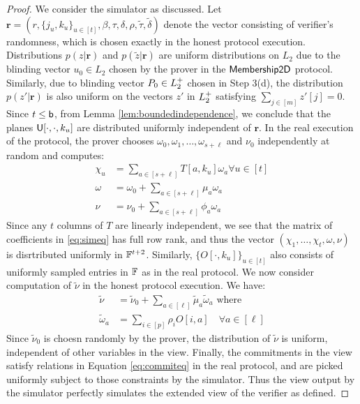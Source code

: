 \begin{proof}
We consider the simulator as discussed. Let $\bm{r}=(r,\{j_u,k_u\}_{u\in
[t]},\beta,\tau,\delta,\rho,\tilde{\tau},\tilde{\delta})$ denote the vector
consisting of verifier's randomness, which is chosen exactly in the honest
protocol execution. Distributions $p(z|\bm{r})$ and $p(\tilde{z}|\bm{r})$ are
uniform distributions on $L_2$ due to the blinding vector $u_0\in L_2$ chosen by
the prover in the $\mathsf{Membership2D}$ protocol. Similarly, due to blinding vector
$P_0\in L^{+}_2$ chosen in Step 3(d), the distribution
$p(z'|\bm{r})$ is also uniform on the vectors $z'$ in $L^{+}_2$ satisfying
$\sum_{j\in [m]}z'[j]=0$. Since $t\leq \mathsf{b}$, from Lemma
\ref{lem:boundedindependence}, we conclude that the planes
$\mathsf{U}[\cdot,\cdot,k_u]$ are distributed uniformly independent of $\bm{r}$. In
the real execution of the protocol, the prover chooses
$\omega_0,\omega_1,\ldots,\omega_{s+\ell}$ and $\nu_0$ independently at random
and computes:
\begin{align}\label{eq:simeq}
\chi_u &= \sum_{a\in [s+\ell]}T[a,k_u]\omega_a \forall u\in [t] \nonumber \\
\omega &= \omega_0 + \sum_{a\in [s+\ell]}\mu_a\omega_a \nonumber \\
\nu &= \nu_0 + \sum_{a\in [s+\ell]}\phi_a\omega_a
\end{align}    
Since any $t$ columns of $T$ are linearly independent, we see that the matrix of
coefficients in \eqref{eq:simeq} has full row rank, and thus the vector
$(\chi_1,\ldots,\chi_t,\omega,\nu)$ is disrtributed uniformly in $\mathbb{F}^{t+2}$.
Similarly, $\{O[\cdot,k_u]\}_{u\in [t]}$ also consists of uniformly sampled
entries in $\mathbb{F}$ as in the real protocol. We now consider computation of
$\tilde{\nu}$ in the honest protocol execution. We have:
\begin{align}\label{eq:simeq2}
\tilde{\nu} &= \tilde{\nu}_0 + \sum_{a\in [\ell]}\tilde{\mu}_a\tilde{\omega}_a
 \text{ where } \nonumber \\
\tilde{\omega}_a &= \sum_{i\in [p]}\rho_iO[i,a] \quad \forall a\in [\ell]
\end{align} 
Since $\tilde{\nu}_0$ is choesn randomly by the prover, the distribution of
$\tilde{\nu}$ is uniform, independent of other variables in the view. Finally,
the commitments in the view satisfy relations in Equation \ref{eq:commiteq} in
the real protocol, and are picked uniformly subject to those constraints by the
simulator. Thus the view output by the simulator perfectly simulates the
extended view of the verifier as defined. 
\end{proof}


